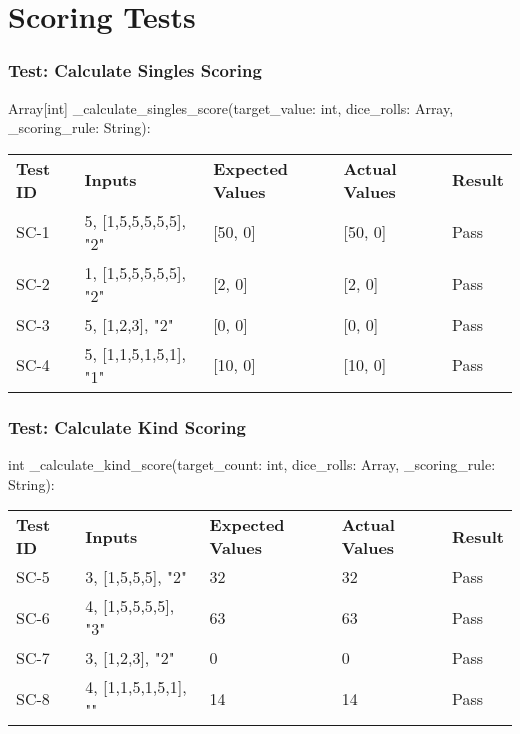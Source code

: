 \documentclass[12pt, titlepage]{article}
\begin{document}
\section{Scoring Tests}

\subsubsection{Test: Calculate Singles Scoring}
Array[int] \_calculate\_singles\_score(target\_value: int, dice\_rolls: Array, \_scoring\_rule: String):\\
\begin{tabularx}{\textwidth}{|p{2cm}|p{3.0cm}|p{4cm}|p{3.0cm}|p{1.5cm}|}
    \cline{1-5}
    \textbf{Test ID} & \textbf{Inputs} & \textbf{Expected Values} & \textbf{Actual Values} & \textbf{Result} \\
    \cline{1-5}
    SC-1 & 5, [1,5,5,5,5,5], "2" & [50, 0] & [50, 0] & Pass \\
    \cline{1-5}
    SC-2 & 1, [1,5,5,5,5,5], "2" & [2, 0] & [2, 0] & Pass \\
    \cline{1-5}
    SC-3 & 5, [1,2,3], "2" & [0, 0] & [0, 0] & Pass \\
    \cline{1-5}
    SC-4 & 5, [1,1,5,1,5,1], "1" & [10, 0] & [10, 0] & Pass \\
    \cline{1-5}
\end{tabularx}

\subsubsection{Test: Calculate Kind Scoring}
int \_calculate\_kind\_score(target\_count: int, dice\_rolls: Array, \_scoring\_rule: String):\\
\begin{tabularx}{\textwidth}{|p{2cm}|p{3.0cm}|p{4cm}|p{3.0cm}|p{1.5cm}|}
    \cline{1-5}
    \textbf{Test ID} & \textbf{Inputs} & \textbf{Expected Values} & \textbf{Actual Values} & \textbf{Result} \\
    \cline{1-5}
    SC-5 & 3, [1,5,5,5], "2" & 32 & 32 & Pass \\
    \cline{1-5}
    SC-6 & 4, [1,5,5,5,5], "3" & 63 & 63 & Pass \\
    \cline{1-5}
    SC-7 & 3, [1,2,3], "2" & 0 & 0 & Pass \\
    \cline{1-5}
    SC-8 & 4, [1,1,5,1,5,1], "" & 14 & 14 & Pass \\
    \cline{1-5}
\end{tabularx}
\end{document}
